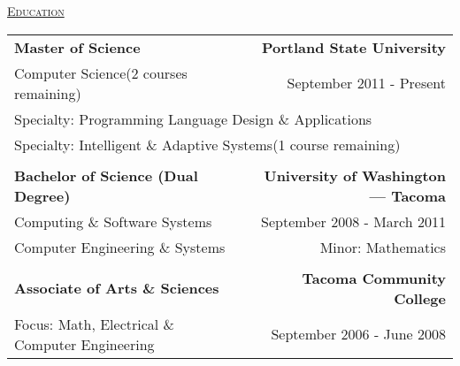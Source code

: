 \documentclass[letterpaper]{article}
\begin{document}
\begin{center}
\begin{tabular}{p{}p{}r}
			\\
		\end{tabular}

		\underline{\large \scshape Education} \\
		\begin{tabular}{p{}r}
				\textbf{Master of Science}							&
				\textbf{Portland State University}
			\\
				Computer Science\quad(2 courses remaining)				&
				September 2011 - Present
			\\
				\multicolumn{2}{p{\textwidth}}{Specialty: Programming Language Design \& Applications}
			\\	
				\multicolumn{2}{p{\textwidth}}{Specialty: Intelligent \& Adaptive Systems\quad(1 course remaining)}
				
			\\
			\\
				\textbf{Bachelor of Science (Dual Degree)}			&
				\textbf{University of Washington — Tacoma}
			\\
				Computing \& Software Systems						&
				September 2008 - March 2011
			\\
				Computer Engineering \& Systems						&
				Minor: Mathematics
			\\
			\\
				\textbf{Associate of Arts \& Sciences}				&
				\textbf{Tacoma Community College}
			\\
				Focus: Math, Electrical \& Computer Engineering		&
				September 2006 - June 2008
		\end{tabular}
	\end{center}
\end{document}
